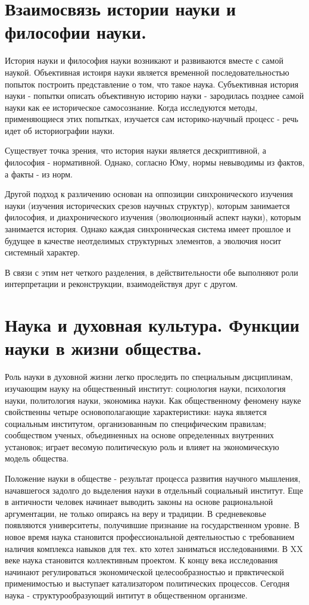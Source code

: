 \documentclass[12pt, specialist, subf, substylefile = spbu.rtx]{disser}
\begin{document}
\section{Взаимосвязь истории науки и философии науки.}
История науки и философия науки возникают и развиваются вместе с самой наукой. Объективная истоиря науки является временной последовательностью попыток построить представление о том, что такое наука. Субъективная история науки - попытки описать объективную историю науки -  зародилась позднее самой науки как ее историческое самосознание. Когда исследуются методы, применяющиеся этих попытках, изучается сам историко-научный процесс - речь идет об историографии науки.

Существует точка зрения, что история науки является дескриптивной, а философия - нормативной. Однако, согласно Юму, нормы невыводимы из фактов, а факты - из норм.

Другой подход к различению основан на оппозиции синхронического изучения науки (изучения исторических срезов научных структур), которым занимается философия, и диахронического изучения (эволюционный аспект науки), которым занимается история. Однако каждая синхроническая система имеет прошлое и будущее в качестве неотделимых структурных элементов, а эволючия носит системный характер.

 В связи с этим нет четкого разделения, в действительности обе выполняют роли интерпретации и реконструкции, взаимодействуя друг с другом.

\section{Наука и духовная культура. Функции науки в жизни общества.}
Роль науки в духовной жизни легко проследить по специальным дисциплинам, изучающим науку на общественный институт: социология науки, психология науки, политология науки, экономика науки. Как общественному феномену науке свойственны четыре основополагающие характеристики: наука является социальным институтом, организованным по специфическим правилам; сообществом ученых, объединенных на основе определенных внутренних установок; играет весомую политическую роль и влияет на экономическую модель общества.

Положение науки в обществе - результат процесса развития научного мышления, начавшегося задолго до выделения науки в отдельный социальный институт. Еще в античности человек начинает выводить законы на основе рациональной аргументации, не только опираясь на веру и традиции. В средневековье появляются университеты, получившие признание на государственном уровне. В новое время наука становится профессиональной деятельностью с требованием наличия комплекса навыков для тех. кто хотел заниматься исследованиями. В XX веке наука становится коллективным проектом. К концу века исследования начинают регулироваться экономической целесообразностью и првктической применимостью и выступает катализатором политических процессов. Сегодня наука - структурообразующий интитут в общественном организме.
\end{document}
